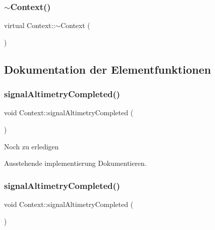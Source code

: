 \subsubsection{\texorpdfstring{$\sim$\+Context()}{~Context()}\hspace{0.1cm}{\footnotesize\ttfamily [2/2]}}
{\footnotesize\ttfamily virtual Context\+::$\sim$\+Context (\begin{DoxyParamCaption}{ }\end{DoxyParamCaption})\hspace{0.3cm}{\ttfamily [virtual]}}



\subsection{Dokumentation der Elementfunktionen}
\hypertarget{class_context_a01e833c79e6ca0d21b419b3f6af9bbdc}{}\label{class_context_a01e833c79e6ca0d21b419b3f6af9bbdc} 
\subsubsection{\texorpdfstring{signal\+Altimetry\+Completed()}{signalAltimetryCompleted()}\hspace{0.1cm}{\footnotesize\ttfamily [1/2]}}
{\footnotesize\ttfamily void Context\+::signal\+Altimetry\+Completed (\begin{DoxyParamCaption}{ }\end{DoxyParamCaption})}

\begin{DoxyRefDesc}{Noch zu erledigen}
\item[\hyperlink{todo__todo000014}{Noch zu erledigen}]Ausstehende implementierung Dokumentieren. \end{DoxyRefDesc}
\hypertarget{class_context_a01e833c79e6ca0d21b419b3f6af9bbdc}{}\label{class_context_a01e833c79e6ca0d21b419b3f6af9bbdc} 
\subsubsection{\texorpdfstring{signal\+Altimetry\+Completed()}{signalAltimetryCompleted()}\hspace{0.1cm}{\footnotesize\ttfamily [2/2]}}
{\footnotesize\ttfamily void Context\+::signal\+Altimetry\+Completed (\begin{DoxyParamCaption}{ }\end{DoxyParamCaption})}

